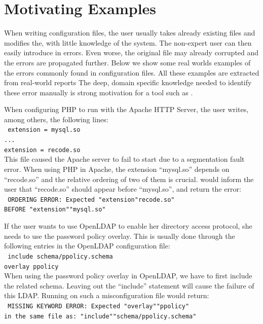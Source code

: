 \section{Motivating Examples}
\label{sec:motiv}

When writing configuration files, the user usually takes already existing files and modifies the, with little knowledge of the system. 
The non-expert user can then easily introduce in errors.
Even worse, the original file may already corrupted and the errors are propagated further. 
Below we show some real worlds examples of the errors commonly found in configuration files.
All these examples are extracted from real-world reports %
The deep, domain specific knowledge needed to identify these error manually is strong motivation for a tool such as \app.

 When configuring PHP to run with the
Apache HTTP Server, the user writes, among others, the following lines:\\
 \texttt{
 \hspace*{3em}extension = mysql.so\\
 \hspace*{3em}...\\
 \hspace*{3em}extension = recode.so}\\
This file caused the Apache server to fail to start due to a segmentation fault error.
When using PHP in Apache, the extension ``mysql.so'' depends on ``recode.so'' and the relative ordering of two of them is crucial. 
\app would inform the user that ``recode.so'' should appear before ``mysql.so'', and return the error:\\
 \texttt{
ORDERING ERROR: Expected "extension"recode.so"\\
   BEFORE "extension""mysql.so"
  }

 If the user wants to use OpenLDAP to enable her directory access
protocol, she needs to use the password policy overlay. This is usually
done through the following entries in the OpenLDAP configuration file:\\
\texttt{
 \hspace*{3em}include schema/ppolicy.schema\\
 \hspace*{3em}overlay ppolicy\\}
When using the password policy overlay in OpenLDAP, we have to first include the related schema.
Leaving out the ``include'' statement will cause the failure of 
this LDAP. Running \app on such a misconfiguration file would return:\\
\texttt{
MISSING KEYWORD ERROR: Expected "overlay""ppolicy"\\ 
in the same file as: "include""schema/ppolicy.schema"}

